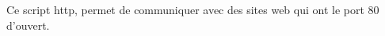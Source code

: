 \documentclass[../file_doc_script.tex]{subfiles}
\begin{document}
Ce script http, permet de communiquer avec des sites web qui ont le port 80 d'ouvert.

\UseRawInputEncoding

\end{document}
